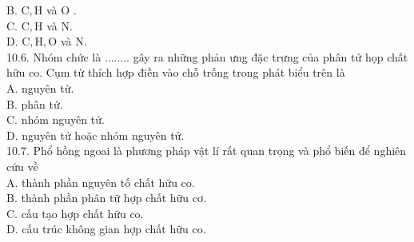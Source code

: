\documentclass[10pt]{article}
\begin{document}
B. $\mathrm{C}, \mathrm{H}$ và O .\\
C. $\mathrm{C}, \mathrm{H}$ và N.\\
D. $\mathrm{C}, \mathrm{H}, \mathrm{O}$ và N.\\
10.6. Nhóm chức là ........ gây ra những phản ưng đặc trưng của phân tử họp chất hữu co. Cụm từ thích hợp điền vào chỗ trống trong phát biểu trên là\\
A. nguyên từ.\\
B. phân tứ.\\
C. nhóm nguyên tử.\\
D. nguyên tử hoặc nhóm nguyên tử.\\
10.7. Phổ hồng ngoai là phương pháp vật lí rất quan trọng và phổ biến để nghiên cứu về\\
A. thành phần nguyên tố chất hữu co.\\
B. thành phần phân tữ hợp chất hữu cơ.\\
C. cấu tạo hợp chất hữu co.\\
D. cấu trúc không gian hợp chất hữu co.
\end{document}
